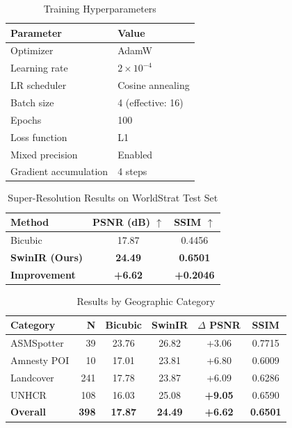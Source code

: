 \begin{table}[h]
\centering
\caption{Training Hyperparameters}
\label{tab:training}
\begin{tabular}{ll}
\toprule
\textbf{Parameter} & \textbf{Value} \\
\midrule
Optimizer & AdamW \\
Learning rate & $2 \times 10^{-4}$ \\
LR scheduler & Cosine annealing \\
Batch size & 4 (effective: 16) \\
Epochs & 100 \\
Loss function & L1 \\
Mixed precision & Enabled \\
Gradient accumulation & 4 steps \\
\bottomrule
\end{tabular}
\end{table}

\begin{table}[h]
\centering
\caption{Super-Resolution Results on WorldStrat Test Set}
\label{tab:results}
\begin{tabular}{lcc}
\toprule
\textbf{Method} & \textbf{PSNR (dB)} $\uparrow$ & \textbf{SSIM} $\uparrow$ \\
\midrule
Bicubic & 17.87 & 0.4456 \\
\textbf{SwinIR (Ours)} & \textbf{24.49} & \textbf{0.6501} \\
\midrule
\textbf{Improvement} & \textbf{+6.62} & \textbf{+0.2046} \\
\bottomrule
\end{tabular}
\end{table}

\begin{table}[h]
\centering
\caption{Results by Geographic Category}
\label{tab:category}
\begin{tabular}{lrcccc}
\toprule
\textbf{Category} & \textbf{N} & \textbf{Bicubic} & \textbf{SwinIR} & \textbf{$\Delta$ PSNR} & \textbf{SSIM} \\
\midrule
ASMSpotter & 39 & 23.76 & 26.82 & +3.06 & 0.7715 \\
Amnesty POI & 10 & 17.01 & 23.81 & +6.80 & 0.6009 \\
Landcover & 241 & 17.78 & 23.87 & +6.09 & 0.6286 \\
UNHCR & 108 & 16.03 & 25.08 & \textbf{+9.05} & 0.6590 \\
\midrule
\textbf{Overall} & \textbf{398} & \textbf{17.87} & \textbf{24.49} & \textbf{+6.62} & \textbf{0.6501} \\
\bottomrule
\end{tabular}
\end{table}


